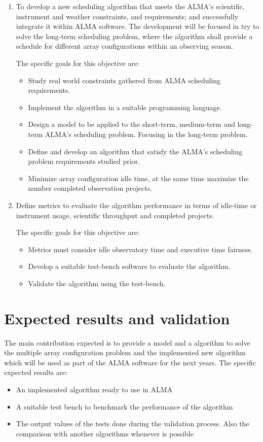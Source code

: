 \begin{enumerate}

\item To develop a new scheduling algorithm that meets the ALMA’s scientific, instrument and
weather constraints, and requirements; and successfully integrate it within ALMA software.
The development will be focused in try to solve the long-term scheduling problem, where
the algorithm shall provide a schedule for different array configurations within an
observing season.

The specific goals for this objective are:
\begin{itemize}
\item Study real world constraints gathered from ALMA scheduling requirements.
\item Implement the algorithm in a suitable programming language.
\item Design a model to be applied to the short-term, medium-term and long-term ALMA’s
scheduling problem. Focusing in the long-term problem.
\item Define and develop an algorithm that satisfy the ALMA’s scheduling problem requirements
studied prior.
\item Minimize array configuration idle time, at the same time maximize the number completed observation projects.
\end{itemize}
\item Define metrics to evaluate the algorithm performance in terms of idle-time or instrument
usage, scientific throughput and completed projects.

The specific goals for this objective are:
\begin{itemize}
\item Metrics must consider idle observatory time and executive time fairness.
\item Develop a suitable test-bench software to evaluate the algorithm.
\item Validate the algorithm using the test-bench.
\end{itemize}
\end{enumerate}

\section{Expected results and validation}
The main contribution expected is to provide a model and a algorithm to solve the multiple array configuration problem and the implemented new algorithm which will be used as part of the ALMA software for the next years.
The specific expected results are:
\begin{itemize}
\item An implemented algorithm ready to use in ALMA
\item A suitable test bench to benchmark the performance of the algorithm
\item The output values of the tests done during the validation process. Also the comparison with
another algorithms whenever is possible
\end{itemize}

